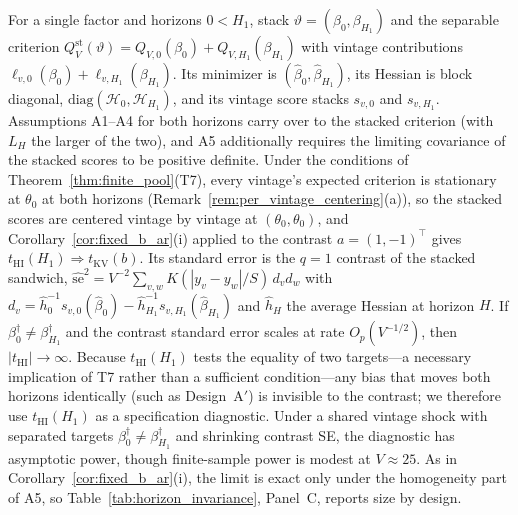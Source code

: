 \begin{remark}
\label{rem:horizon_invariance}
For a single factor and horizons $0 < H_1$, stack $\vartheta = (\beta_0, \beta_{H_1})$ and the separable criterion $Q_V^{\mathrm{st}}(\vartheta) = Q_{V,0}(\beta_0) + Q_{V,H_1}(\beta_{H_1})$ with vintage contributions $\ell_{v,0}(\beta_0) + \ell_{v,H_1}(\beta_{H_1})$. Its minimizer is $(\hat\beta_0, \hat\beta_{H_1})$, its Hessian is block diagonal, $\mathrm{diag}(\mathcal{H}_0, \mathcal{H}_{H_1})$, and its vintage score stacks $s_{v,0}$ and $s_{v,H_1}$. Assumptions A1--A4 for both horizons carry over to the stacked criterion (with $L_H$ the larger of the two), and A5 additionally requires the limiting covariance of the stacked scores to be positive definite.
Under the conditions of Theorem~\ref{thm:finite_pool}(T7), every vintage's expected criterion is stationary at $\theta_0$ at both horizons (Remark~\ref{rem:per_vintage_centering}(a)), so the stacked scores are centered vintage by vintage at $(\theta_0, \theta_0)$, and Corollary~\ref{cor:fixed_b_ar}(i) applied to the contrast $a = (1, -1)^\top$ gives $t_{\mathrm{HI}}(H_1) \Rightarrow t_{\mathrm{KV}}(b)$. Its standard error is the $q=1$ contrast of the stacked sandwich, $\widehat{\mathrm{se}}^2 = V^{-2}\sum_{v,w} K(|y_v-y_w|/S)\,d_v d_w$ with $d_v = \hat{h}_0^{-1}s_{v,0}(\hat\beta_0) - \hat{h}_{H_1}^{-1}s_{v,H_1}(\hat\beta_{H_1})$ and $\hat h_H$ the average Hessian at horizon $H$.
If $\beta_0^\dagger \neq \beta_{H_1}^\dagger$ and the contrast standard error scales at rate $O_p(V^{-1/2})$, then $|t_{\mathrm{HI}}| \to \infty$. Because $t_{\mathrm{HI}}(H_1)$ tests the equality of two targets---a necessary implication of T7 rather than a sufficient condition---any bias that moves both horizons identically (such as Design~A$'$) is invisible to the contrast; we therefore use $t_{\mathrm{HI}}(H_1)$ as a specification diagnostic. Under a shared vintage shock with separated targets $\beta_0^\dagger \neq \beta_{H_1}^\dagger$ and shrinking contrast SE, the diagnostic has asymptotic power, though finite-sample power is modest at $V \approx 25$. As in Corollary~\ref{cor:fixed_b_ar}(i), the \citet{KV05} limit is exact only under the homogeneity part of A5, so Table~\ref{tab:horizon_invariance}, Panel~C, reports size by design.
\end{remark}

